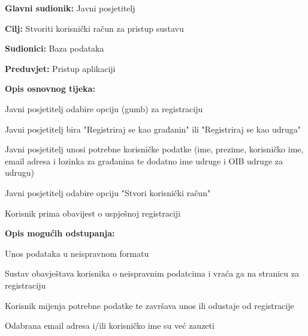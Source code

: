 	
	

	
			\noindent {}
			\begin{packed_item}
				
				\item \textbf{Glavni sudionik:} Javni posjetitelj
				\item  \textbf{Cilj:} Stvoriti korisnički račun za pristup sustavu
				\item  \textbf{Sudionici:} Baza podataka
				\item  \textbf{Preduvjet:} Pristup aplikaciji
				\item  \textbf{Opis osnovnog tijeka:}
				
				\item[] \begin{packed_enum}
					
					\item Javni posjetitelj odabire opciju (gumb) za registraciju 
					\item Javni posjetitelj bira "Registriraj se kao građanin" ili "Registriraj se kao udruga"
					\item Javni posjetitelj unosi potrebne korisničke podatke (ime, prezime, korisničko ime, email adresa i lozinka za građanina te dodatno ime udruge i OIB udruge za udrugu)
					\item Javni posjetitelj odabire opciju "Stvori korisnički račun"
					\item Korisnik prima obavijest o uspješnoj registraciji
				\end{packed_enum}
				
				\item  \textbf{Opis mogućih odstupanja:}
				
				\item[] \begin{packed_item}
					
					\item [2.a] Unos podataka u neispravnom formatu 
					\item[] \begin{packed_enum}
						
						\item Sustav obavještava korisnika o neispravnim podatcima i vraća ga na stranicu za registraciju
						\item Korisnik mijenja potrebne podatke te završava unos ili odustaje od registracije

					\end{packed_enum}
					\item [2.b] Odabrana email adresa i/ili korisničko ime su već zauzeti
					\item[] \begin{packed_enum}
					

\end{packed_enum}
\end{packed_item}
\end{packed_item}
